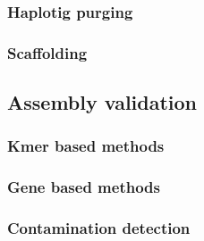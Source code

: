 \subsubsection{Haplotig purging}
\subsubsection{Scaffolding}

\subsection{Assembly validation}
\subsubsection{Kmer based methods}
\subsubsection{Gene based methods}
\subsubsection{Contamination detection}

